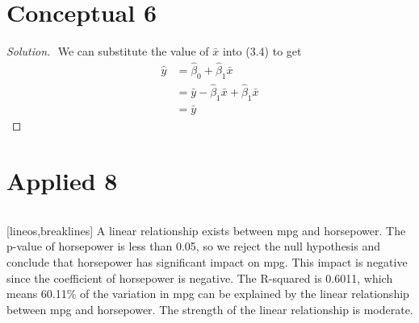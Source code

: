 \documentclass{article}
\newenvironment{solution}
{\renewcommand\qedsymbol{$\blacksquare$}
\begin{proof}[Solution]$ $}
  {
\end{proof}}
\begin{document}
\section*{Conceptual 6}
\begin{solution}
  We can substitute the value of \(\bar x\) into (3.4) to get
  \begin{align*}
    \hat y &= \hat \beta_0 + \hat \beta_1 \bar x \\
    &= \bar y - \hat \beta_1 \bar x + \hat \beta_1 \bar x \\
    &= \bar y
  \end{align*}
\end{solution}
\newpage
\section*{Applied 8}
\inputminted{r}{q8.R}[lineos,breaklines]
A linear relationship exists between mpg and horsepower. The p-value of horsepower is less than 0.05, so we reject the null hypothesis and conclude that horsepower has significant impact on mpg. This impact is negative since the coefficient of horsepower is negative. The R-squared is 0.6011, which means 60.11\% of the variation in mpg can be explained by the linear relationship between mpg and horsepower. The strength of the linear relationship is moderate.
\end{document}
